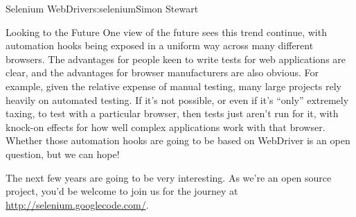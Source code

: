 \begin{aosachapter}{Selenium WebDriver}{s:selenium}{Simon Stewart}
\begin{aosasect1}{Looking to the Future}
One view of the future sees this trend continue, with automation hooks
being exposed in a uniform way across many different browsers. The
advantages for people keen to write tests for web applications are
clear, and the advantages for browser manufacturers are also
obvious. For example, given the relative expense of manual testing,
many large projects rely heavily on automated testing. If it's not
possible, or even if it's ``only'' extremely taxing, to test with a
particular browser, then tests just aren't run for it, with knock-on
effects for how well complex applications work with that
browser. Whether those automation hooks are going to be based on
WebDriver is an open question, but we can hope!

The next few years are going to be very interesting. As we're an open
source project, you'd be welcome to join us for the journey at
\url{http://selenium.googlecode.com/}.

\end{aosasect1}

\end{aosachapter}

